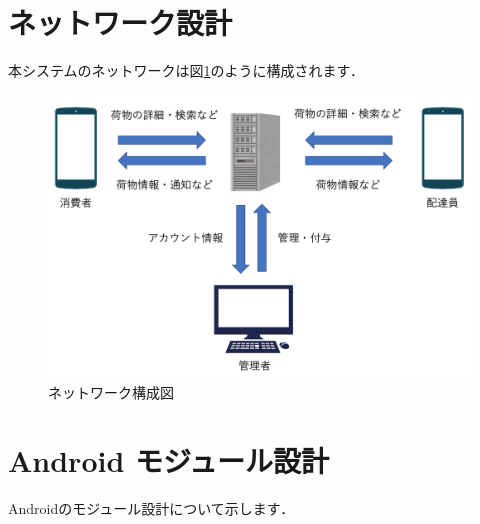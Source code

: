 \documentclass[a4j,titlepage]{jarticle}
\begin{document}
\section{ネットワーク設計}
本システムのネットワークは図\ref{fig:n_d}のように構成されます．

\begin{figure}[H]
 \begin{center}
  \includegraphics[width=140mm]{Network_Diagram.png}
  \caption{ネットワーク構成図}
  \label{fig:n_d}
 \end{center}

\end{figure}

\section{Android モジュール設計}
Androidのモジュール設計について示します．
\end{document}
